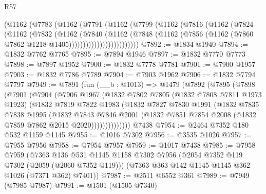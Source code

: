 \begin{lexlean}{R57}
\begin{coremodule}
              (@1162
                (@7783
                  (@1162
                    (@7791
                      (@1162
                        (@7799
                          (@1162
                            (@7816
                              (@1162
                                (@7824
                                  (@1162
                                    (@7832
                                      (@1162
                                        (@7840
                                          (@1162
                                            (@7848
                                              (@1162
                                                (@7856
                                                  (@1162
                                                    (@7860
                                                      @7862
                                                      @1218
                                                      @1405)))))))))))))))))))))))))
@7892 := @1834 @1940
@7894 := @1832 @7762 @7765
@7895 := @7894 @1946
@7897 := @1832 @7770 @7773
@7898 := @7897 @1952
@7900 := @1832 @7778 @7781
@7901 := @7900 @1957
@7903 := @1832 @7786 @7789
@7904 := @7903 @1962
@7906 := @1832 @7794 @7797
@7949 := @7891
    (fun (__b : @1013) =>
    @1479
      (@7892
        (@7895
          (@7898
            (@7901
              (@7904
                (@7906
                  @1967
                  (@1832
                    @7802
                    @7805
                    (@1832 @7808 @7811 @1973 @1923)
                    (@1832
                      @7819
                      @7822
                      @1983
                      (@1832
                        @7827
                        @7830
                        @1991
                        (@1832
                          @7835
                          @7838
                          @1995
                          (@1832
                            @7843
                            @7846
                            @2001
                            (@1832 @7851 @7854 @2008 (@1832 @7859 @7862 @2015 @2020))))))))))))))
    @7438
@7954 := @2464 @7352 @180 @532 @1159 @1145
@7955 := @1016 @7302
@7956 := @3535 @1026
@7957 := @7955 @7956
@7958 := @7954 @7957
@7959 := @1017 @7438
@7985 := @7958
    @7959
    (@7363
      @136
      @531
      @1145
      @1158
      @7302
      @7956
      (@2054 @7352 @119 @7302 (@2059 (@2060 @7352 @119)))
      (@7363 @363 @142 @1145 @1145 @362 @1026 (@7371 @362) @7401))
@7987 := @2511 @6552 @361
@7989 := @7949 (@7985 @7987)
@7991 := @1501 (@1505 @7340)

\end{coremodule}
\end{lexlean}
